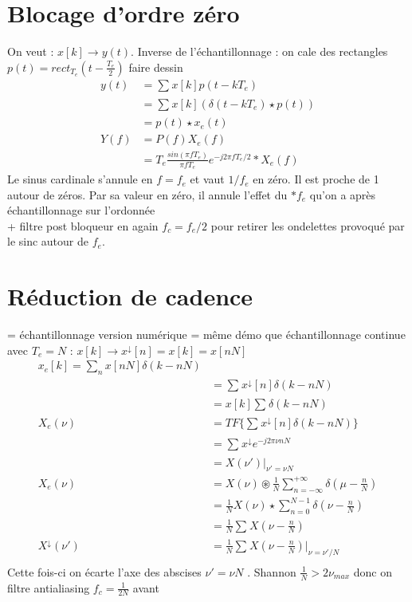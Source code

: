 \documentclass{article}
\theoremstyle{plain}%
\theoremstyle{definition}
\theoremstyle{remark}
\begin{document}
\section{Blocage d'ordre zéro}
On veut : $ x[k] \to y(t) $. Inverse de l'échantillonnage : on cale des rectangles $ p(t) = rect_{T_e} (t - \frac{T_e}{2}) $ faire dessin
\begin{align*}
    y(t)&= \sum_{}^{}x[k]p(t - kT_e) \\
        &= \sum_{}^{}x[k](\delta (t - kT_e) \star p(t)) \\
        &= p(t) \star x_e(t) \\
    Y(f)&= P(f)X_e(f) \\
        &= T_e \frac{sin(\pi f T_e)}{\pi f T_e} e^{-j 2 \pi f T_e/2} * X_e(f)
\end{align*}
Le sinus cardinale s'annule en $ f = f_e $ et vaut $ 1/f_e $ en zéro. Il est proche de 1 autour de zéros. Par sa valeur en zéro, il annule l'effet du $ *f_e $ qu'on a après échantillonnage sur l'ordonnée\\
+ filtre post bloqueur en again $ f_c = f_e/2 $ pour retirer les ondelettes provoqué par le sinc autour de $ f_e $. 

\section{Réduction de cadence}
= échantillonnage version numérique = même démo que échantillonnage continue avec $ T_e = N $  : $ x[k] \to x^\downarrow [n] = x[k] = x[nN] $
\begin{align*}
    x_e[k] = \sum_{n}^{}x[nN] \delta (k-nN) \\
            &= \sum_{}^{}x^\downarrow [n] \delta (k - nN) \\
            &= x[k] \sum_{}^{}\delta (k - nN) \\
    X_e(\nu ) &= TF\{\sum_{}^{}x^\downarrow [n] \delta (k - nN)\} \\
            &= \sum_{}^{}x^\downarrow e^{- j 2 \pi \nu nN} \\
            &= X(\nu ') \vert_{\nu ' = \nu N} \\
    X_e(\nu ) &= X(\nu ) \circledast \frac{1}{N}\sum_{n= -\infty }^{+\infty }\delta (\mu - \frac{n}{N}) \\
            &= \frac{1}{N} X( \nu ) \star \sum_{n=0}^{N-1}\delta (\nu - \frac{n}{N}) \\
            &= \frac{1}{N} \sum_{}^{}X(\nu - \frac{n}{N}) \\
    X^\downarrow (\nu ') &= \frac{1}{N} \sum_{}^{}X(\nu - \frac{n}{N}) \vert _{\nu = \nu ' / N}\\
\end{align*}
Cette fois-ci on écarte l'axe des abscises $ \nu ' = \nu N $ . Shannon $ \frac{1}{N} > 2 \nu _{max} $  donc on filtre antialiasing $ f_c = \frac{1}{2N} $  avant 
\end{document}
